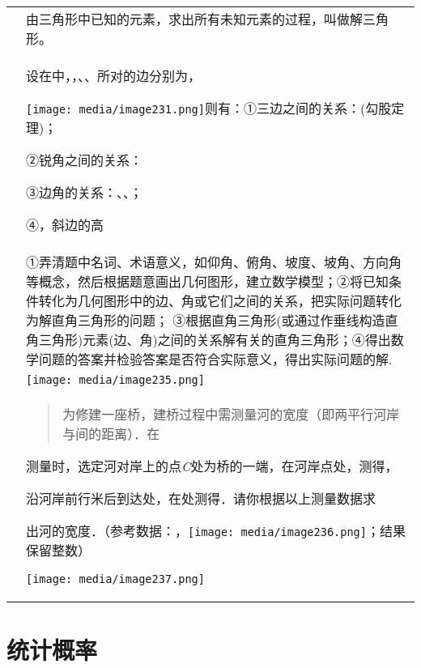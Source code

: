 \documentclass[a4paper,11pt,UTF8]{ctexart}
\begin{document}
\begin{longtable}[]{@{}ll@{}}
\toprule
\endhead
&
由三角形中已知的元素，求出所有未知元素的过程，叫做解三角形。\tabularnewline
\begin{minipage}[t]{0.47\columnwidth}\raggedright
\strut
\end{minipage} & \begin{minipage}[t]{0.47\columnwidth}\raggedright
设在中，，、、所对的边分别为，

\texttt{[image: media/image231.png]}则有：①三边之间的关系：(勾股定理)；

②锐角之间的关系：　

③边角的关系：、、；

④，斜边的高~\strut
\end{minipage}\tabularnewline
&
①弄清题中名词、术语意义，如仰角、俯角、坡度、坡角、方向角等概念，然后根据题意画出几何图形，建立数学模型；②将已知条件转化为几何图形中的边、角或它们之间的关系，把实际问题转化为解直角三角形的问题；
③根据直角三角形(或通过作垂线构造直角三角形)元素(边、角)之间的关系解有关的直角三角形；④得出数学问题的答案并检验答案是否符合实际意义，得出实际问题的解.
~\tabularnewline
&
\texttt{[image: media/image235.png]}\tabularnewline
\begin{minipage}[t]{0.47\columnwidth}\raggedright
\strut
\end{minipage} & \begin{minipage}[t]{0.47\columnwidth}\raggedright
\begin{quote}
为修建一座桥，建桥过程中需测量河的宽度（即两平行河岸与间的距离）．在
\end{quote}

测量时，选定河对岸上的点\emph{C}处为桥的一端，在河岸点处，测得，

沿河岸前行米后到达处，在处测得．请你根据以上测量数据求

出河的宽度．（参考数据：，\texttt{[image: media/image236.png]}；结果保留整数）

\texttt{[image: media/image237.png]}\strut
\end{minipage}\tabularnewline
\bottomrule
\end{longtable}

\hypertarget{ux7edfux8ba1ux6982ux7387}{%
\section{\texorpdfstring{
统计概率}{ 统计概率}}\label{ux7edfux8ba1ux6982ux7387}}
\end{document}
